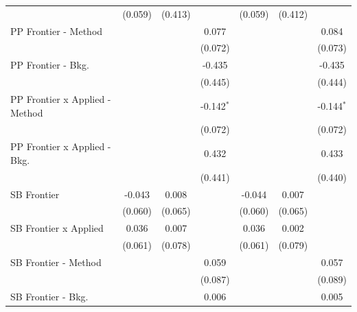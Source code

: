 \begin{tabular}{lcccccc}
                                  & (0.059)        & (0.413)      &              & (0.059)        & (0.412)      &   \\   
   PP Frontier - Method           &                &              & 0.077        &                &              & 0.084\\   
                                  &                &              & (0.072)      &                &              & (0.073)\\   
   PP Frontier - Bkg.             &                &              & -0.435       &                &              & -0.435\\   
                                  &                &              & (0.445)      &                &              & (0.444)\\   
   PP Frontier x Applied - Method &                &              & -0.142$^{*}$ &                &              & -0.144$^{*}$\\   
                                  &                &              & (0.072)      &                &              & (0.072)\\   
   PP Frontier x Applied - Bkg.   &                &              & 0.432        &                &              & 0.433\\   
                                  &                &              & (0.441)      &                &              & (0.440)\\   
   SB Frontier                    & -0.043         & 0.008        &              & -0.044         & 0.007        &   \\   
                                  & (0.060)        & (0.065)      &              & (0.060)        & (0.065)      &   \\   
   SB Frontier x Applied          & 0.036          & 0.007        &              & 0.036          & 0.002        &   \\   
                                  & (0.061)        & (0.078)      &              & (0.061)        & (0.079)      &   \\   
   SB Frontier - Method           &                &              & 0.059        &                &              & 0.057\\   
                                  &                &              & (0.087)      &                &              & (0.089)\\   
   SB Frontier - Bkg.             &                &              & 0.006        &                &              & 0.005\\   

\end{tabular}
